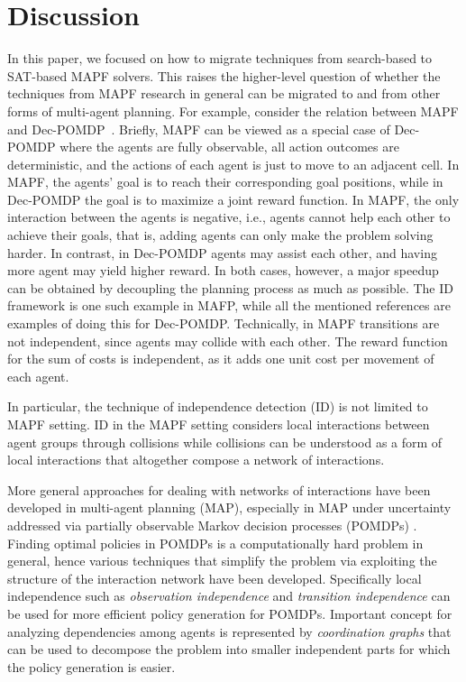 \documentclass[jair,oneside,11pt]{article}
\begin{document}
\section{Discussion}

In this paper, we focused on how to migrate techniques from search-based to SAT-based MAPF solvers.
This raises the higher-level question of whether the techniques from MAPF research in general can be migrated to and from other forms of multi-agent planning. 
For example, consider the relation between MAPF and Dec-POMDP~\cite{DBLP:journals/mor/BernsteinGIZ02,DBLP:conf/aaai/OliehoekWK12,Witwicki2011,DBLP:conf/aips/WitwickiD10,DBLP:conf/aips/VarakanthamKTMST09,DBLP:journals/jair/BeckerZLG04}. 
Briefly, MAPF can be viewed as a special case of Dec-POMDP where the agents are fully observable, all action outcomes are deterministic, and the actions of each agent is just to move to an adjacent cell. In MAPF, the agents’ goal is to reach their corresponding goal positions, while in Dec-POMDP the goal is to maximize a joint reward function. In MAPF, the only interaction between the agents is negative, i.e., agents cannot help each other to achieve their goals, that is, adding agents can only make the problem solving harder. In contrast, in Dec-POMDP agents may assist each other, and having more agent may yield higher reward. In both cases, however, a major speedup can be obtained by decoupling the planning process as much as possible. The ID framework is one such example in MAFP, while all the mentioned references are examples of doing this for Dec-POMDP. Technically, in MAPF transitions are not independent, since agents may collide with each other. The reward function for the sum of costs is independent, as it adds one unit cost per movement of each agent. 


In particular, the technique of independence detection (ID) is not limited to MAPF setting. 
ID in the MAPF setting considers local interactions between agent groups through collisions while collisions can be understood as a form of local interactions that altogether compose a network of interactions. 

More general approaches for dealing with networks of interactions have been developed in multi-agent planning (MAP), especially in MAP under uncertainty addressed via partially observable Markov decision processes (POMDPs) \cite{DBLP:conf/aaai/NairVTY05}. Finding optimal policies in POMDPs is a computationally hard problem in general, hence various techniques that simplify the problem via exploiting the structure of the interaction network have been developed. Specifically local independence such as {\em observation independence} and {\em transition independence} can be used for more efficient policy generation for POMDPs. Important concept for analyzing dependencies among agents is represented by {\em coordination graphs} \cite{DBLP:conf/nips/GuestrinKP01,DBLP:conf/aaai/GuestrinVK02} that can be used to decompose the problem into smaller independent parts for which the policy generation is easier.
\end{document}
